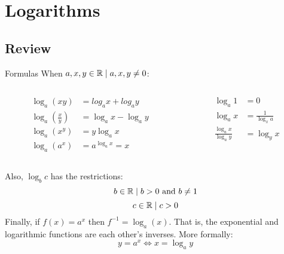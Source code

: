 \section{Logarithms}
\subsection{Review}
\begin{namedframe}{Formulas}
	When $a, x, y \in \mathbb{R} \mid a, x, y \neq 0$:
	\begin{columns}
		\begin{column}{0.5\textwidth}
			\begin{align*}
				\log_a(xy)                       &= log_a x + log_a y\\
				\log_a\left( \frac{x}{y} \right) &= \log_a x - \log_a y\\
				\log_a(x^y)                      &= y \log_a x\\
				\log_a (a^x)                     &= a^{\log_a x} = x
			\end{align*}
		\end{column}
		\begin{column}{0.5\textwidth}
			\begin{align*}
				\log_a 1                  &= 0\\
				\log_a x                  &= \frac{1}{\log_x a}\\
				\frac{\log_a x}{\log_a y} &= \log_y x
			\end{align*}
		\end{column}
	\end{columns}
	\pause
	Also, $\log_b c$ has the restrictions:
	\[b \in \mathbb{R} \mid b > 0 \text{ and } b \neq 1\]
	\[c \in \mathbb{R} \mid c > 0\]
	\pause
	Finally, if $f(x) = a^x$ then $f^{-1} = \log_a(x)$.
	That is, the exponential and logarithmic functions are each other's inverses.
	More formally:
	\[y = a^x \iff x = \log_a y\]
\end{namedframe}
